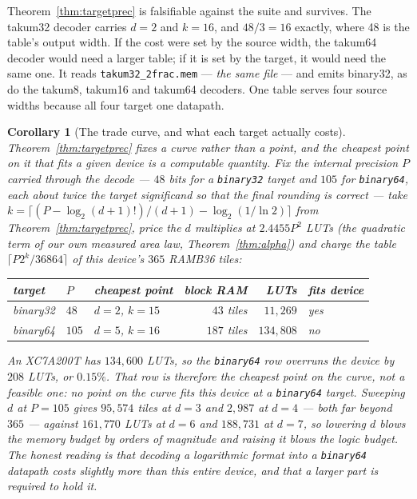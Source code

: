 \documentclass[11pt]{article}
\newtheorem{corollary}{Corollary}
\theoremstyle{definition}
\begin{document}
Theorem~\ref{thm:targetprec} is falsifiable against the suite and survives. The
takum32 decoder carries $d = 2$ and $k = 16$, and $48/3 = 16$ exactly, where 48 is
the table's output width. If the cost were set by the source width, the takum64
decoder would need a larger table; if it is set by the target, it would need the
same one. It reads \texttt{takum32\_2frac.mem} --- \emph{the same file} --- and
emits binary32, as do the takum8, takum16 and takum64 decoders. One table serves
four source widths because all four target one datapath.

\begin{corollary}[The trade curve, and what each target actually costs]
\label{cor:tradecurve}
Theorem~\ref{thm:targetprec} fixes a curve rather than a point, and the cheapest
point on it that fits a given device is a computable quantity. Fix the internal
precision $P$ carried through the decode --- $48$ bits for a \texttt{binary32}
target and $105$ for \texttt{binary64}, each about twice the target significand so
that the final rounding is correct --- take $k = \lceil (P - \log_2 (d+1)!)/(d+1) -
\log_2(1/\ln 2)\rceil$ from Theorem~\ref{thm:targetprec}, price the $d$ multiplies
at $2.4455 P^{2}$ LUTs (the quadratic term of our own measured area law,
Theorem~\ref{thm:alpha}) and charge the table $\lceil P 2^{k}/36864\rceil$ of this
device's $365$ RAMB36 tiles:
\begin{center}
\begin{tabular}{lllrrl}
\toprule
target & $P$ & cheapest point & block RAM & LUTs & fits device \\
\midrule
binary32 & $48$ & $d = 2$, $k = 15$ & $43$ tiles & $11{,}269$ & yes \\
binary64 & $105$ & $d = 5$, $k = 16$ & $187$ tiles & $134{,}808$ & no \\
\bottomrule
\end{tabular}
\end{center}
An XC7A200T has $134{,}600$ LUTs, so the \texttt{binary64} row overruns the device
by $208$ LUTs, or $0.15\%$. That row is therefore the cheapest point on the curve,
not a feasible one: no point on the curve fits this device at a
\texttt{binary64} target. Sweeping $d$ at $P = 105$ gives $95{,}574$ tiles at
$d=3$ and $2{,}987$ at $d=4$ --- both far beyond $365$ --- against $161{,}770$ LUTs
at $d=6$ and $188{,}731$ at $d=7$, so lowering $d$ blows the memory budget by
orders of magnitude and raising it blows the logic budget. The honest reading is
that decoding a logarithmic format into a \texttt{binary64} datapath costs slightly
more than this entire device, and that a larger part is required to hold it.
\end{corollary}
\end{document}

